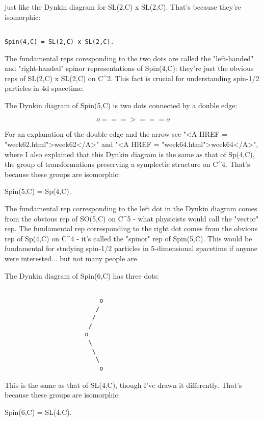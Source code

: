 just like the Dynkin diagram for SL(2,C) x SL(2,C).  That's because 
they're isomorphic:


\begin{verbatim}

Spin(4,C) = SL(2,C) x SL(2,C).
\end{verbatim}
    
The fundamental reps coresponding to the two dots are called 
the "left-handed" and "right-handed" spinor 
representations of Spin(4,C): they're just the obvious reps of 
SL(2,C) x SL(2,C) on C^{2}.  This fact is crucial for
understanding spin-1/2 particles in 4d spacetime. 

The Dynkin diagram of Spin(5,C) is two dots connected by a
double edge:



$$

                      o===>===o 
$$
    
For an explanation of the double edge and the arrow 
see "<A HREF = "week62.html">week62</A>"
and "<A HREF = "week64.html">week64</A>", 
where I also explained that this Dynkin diagram is the
same as that of Sp(4,C), the group of transformations preserving
a symplectic structure on C^4.  That's because these groups are isomorphic:

Spin(5,C) = Sp(4,C).

The fundamental rep corresponding to the left dot in the Dynkin diagram
comes from the obvious rep of SO(5,C) on C^{5} - what physicists would
call the "vector" rep.  The fundamental rep corresponding to the right
dot comes from the obvious rep of Sp(4,C) on C^{4} - it's called the
"spinor" rep of Spin(5,C).  This would be fundamental for
studying spin-1/2 particles in 5-dimensional spacetime if anyone were
interested... but not many people are.  

The Dynkin diagram of Spin(6,C) has three dots:

\begin{verbatim}

                          o
                         /
                        /
                       /
                      o
                       \
                        \
                         \
                          o
\end{verbatim}
    
This is the same as that of SL(4,C), though I've drawn it differently.
That's because these groups are isomorphic:

Spin(6,C) = SL(4,C).

